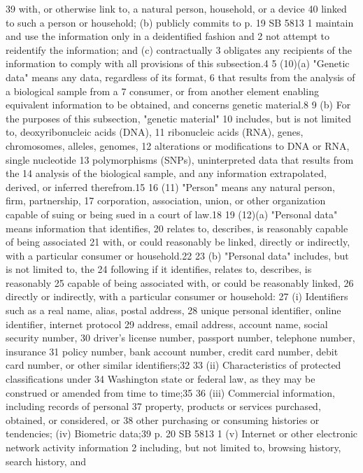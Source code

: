 39 with, or otherwise link to, a natural person, household, or a device
40 linked to such a person or household; (b) publicly commits to
p. 19 SB 5813
1 maintain and use the information only in a deidentified fashion and
2 not attempt to reidentify the information; and (c) contractually
3 obligates any recipients of the information to comply with all
provisions of this subsection.4
5 (10)(a) "Genetic data" means any data, regardless of its format,
6 that results from the analysis of a biological sample from a
7 consumer, or from another element enabling equivalent information to
be obtained, and concerns genetic material.8
9 (b) For the purposes of this subsection, "genetic material"
10 includes, but is not limited to, deoxyribonucleic acids (DNA),
11 ribonucleic acids (RNA), genes, chromosomes, alleles, genomes,
12 alterations or modifications to DNA or RNA, single nucleotide
13 polymorphisms (SNPs), uninterpreted data that results from the
14 analysis of the biological sample, and any information extrapolated,
derived, or inferred therefrom.15
16 (11) "Person" means any natural person, firm, partnership,
17 corporation, association, union, or other organization capable of
suing or being sued in a court of law.18
19 (12)(a) "Personal data" means information that identifies,
20 relates to, describes, is reasonably capable of being associated
21 with, or could reasonably be linked, directly or indirectly, with a
particular consumer or household.22
23 (b) "Personal data" includes, but is not limited to, the
24 following if it identifies, relates to, describes, is reasonably
25 capable of being associated with, or could be reasonably linked,
26 directly or indirectly, with a particular consumer or household:
27 (i) Identifiers such as a real name, alias, postal address,
28 unique personal identifier, online identifier, internet protocol
29 address, email address, account name, social security number,
30 driver's license number, passport number, telephone number, insurance
31 policy number, bank account number, credit card number, debit card
number, or other similar identifiers;32
33 (ii) Characteristics of protected classifications under
34 Washington state or federal law, as they may be construed or amended
from time to time;35
36 (iii) Commercial information, including records of personal
37 property, products or services purchased, obtained, or considered, or
38 other purchasing or consuming histories or tendencies;
(iv) Biometric data;39
p. 20 SB 5813
1 (v) Internet or other electronic network activity information
2 including, but not limited to, browsing history, search history, and
